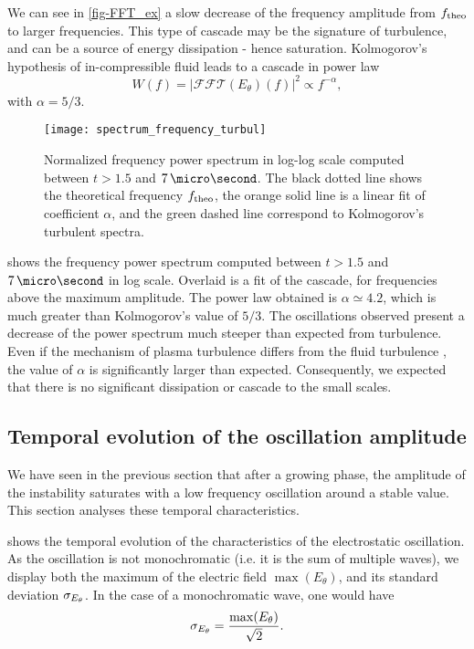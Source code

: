   We can see in \cref{fig-FFT_ex} a slow decrease of the frequency amplitude from $f_{\rm theo}$ to larger frequencies.
  This type of cascade may be the signature of turbulence, and can be a source of energy dissipation - hence saturation.
  Kolmogorov's hypothesis of in-compressible fluid leads to a cascade in power law \[ W(f) = | \mathcal{FFT}(E_{\theta})(f) |^2 \propto f ^ {- \alpha}, \]
  with $\alpha = 5/3$.
  \begin{figure}[!hbt]
    \centering
    \texttt{[image: spectrum\_frequency\_turbul]}
    \caption{Normalized frequency power spectrum in log-log scale computed between $t > 1.5$ and $7\,\micro\second$. The black dotted line shows the  theoretical frequency $f_{\rm theo}$, the orange solid line is a linear fit of coefficient $\alpha$, and the green dashed line correspond to Kolmogorov's turbulent spectra. }
    \label{fig-turbul}
  \end{figure}
  
   shows the frequency power spectrum computed between $t > 1.5$ and $7\,\micro\second$ in log scale.
  Overlaid is a fit of the cascade, for frequencies above the maximum amplitude.
  The power law obtained is $\alpha \simeq 4.2$, which is much greater than Kolmogorov's value of $5/3$.
  The oscillations observed present a decrease of the power spectrum much steeper than expected from turbulence.
  Even if the mechanism of plasma turbulence differs from the fluid turbulence \citep{tsytovich1972}, the value of $\alpha$ is significantly larger than expected.
  Consequently, we expected that there is no significant dissipation or cascade to the small scales.
  
  \subsection{Temporal evolution of the oscillation amplitude} \label{subsec-temp}
  We have seen in the previous section that after a growing phase, the amplitude of the instability saturates with a low frequency oscillation around a stable value.
  This section analyses these temporal characteristics.
  
   shows the temporal evolution of the characteristics of the electrostatic oscillation.
  As the oscillation is not monochromatic (i.e. it is the sum of multiple waves), we display both the maximum of the electric field $\max(E_{\theta})$, and its standard deviation $\sigma_{E_{\theta}}$.
  In the case of a monochromatic wave, one would have 
  \[ \sigma_{E_{\theta}} = \frac{\max(E_{\theta})}{\sqrt{2}}.  \]
  
